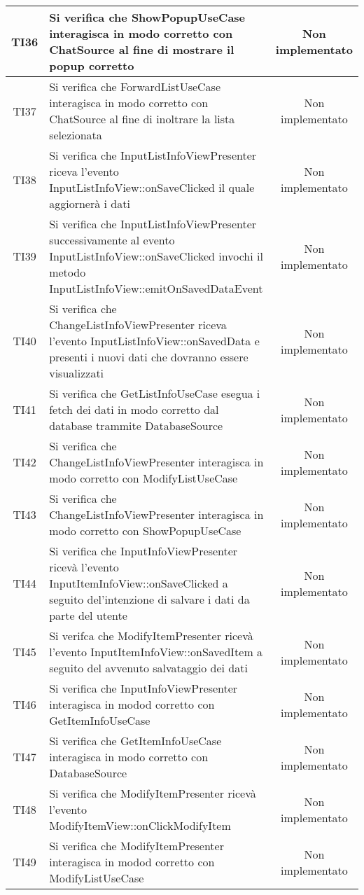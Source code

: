 \begin{center}
\begin{longtable}{|c|>{\centering}m{10cm}|c|}
		TI36 & Si verifica che ShowPopupUseCase interagisca in modo corretto con ChatSource al fine di mostrare il popup corretto & Non implementato \\ \hline
		TI37 & Si verifica che ForwardListUseCase interagisca in modo corretto con ChatSource al fine di inoltrare la lista selezionata & Non implementato \\ \hline
		TI38 & Si verifica che InputListInfoViewPresenter riceva l'evento InputListInfoView::onSaveClicked il quale aggiornerà i dati & Non implementato \\ \hline
		TI39 & Si verifica che InputListInfoViewPresenter successivamente al evento InputListInfoView::onSaveClicked invochi il metodo InputListInfoView::emitOnSavedDataEvent & Non implementato \\ \hline
		TI40 & Si verifica che ChangeListInfoViewPresenter riceva l'evento InputListInfoView::onSavedData e presenti i nuovi dati che dovranno essere visualizzati & Non implementato \\ \hline
		TI41 & Si verifica che GetListInfoUseCase esegua i fetch dei dati in modo corretto dal database trammite DatabaseSource & Non implementato \\ \hline
		TI42 & Si verifica che ChangeListInfoViewPresenter interagisca in modo corretto con ModifyListUseCase & Non implementato \\ \hline
		TI43 & Si verifica che ChangeListInfoViewPresenter interagisca in modo corretto con ShowPopupUseCase & Non implementato \\ \hline
		TI44 & Si verifica che InputInfoViewPresenter ricevà l'evento InputItemInfoView::onSaveClicked a seguito del'intenzione di salvare i dati da parte del utente & Non implementato \\ \hline
		TI45 & Si verifca che ModifyItemPresenter ricevà l'evento InputItemInfoView::onSavedItem a seguito del avvenuto salvataggio dei dati & Non implementato \\ \hline
		TI46 & Si verifica che InputInfoViewPresenter interagisca in modod corretto con GetItemInfoUseCase & Non implementato \\ \hline
		TI47 & Si verifica che GetItemInfoUseCase interagisca in modo corretto con DatabaseSource & Non implementato \\ \hline
		TI48 & Si verifica che ModifyItemPresenter ricevà l'evento ModifyItemView::onClickModifyItem & Non implementato \\ \hline
		TI49 & Si verifica che ModifyItemPresenter interagisca in modod corretto con ModifyListUseCase & Non implementato \\ \hline

\end{longtable}
\end{center}
